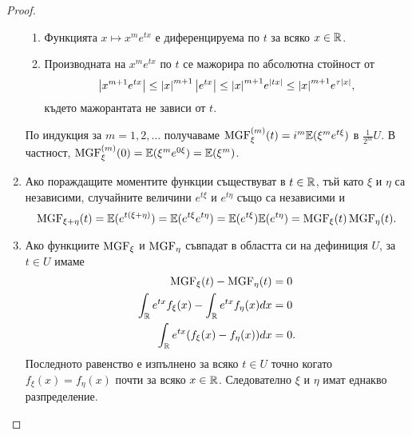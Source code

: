 \documentclass[numbers=endperiod, DIV=15, bibliography=totocnumbered]{scrartcl}
\begin{document}
\begin{proof}
\begin{enumerate}
\begin{enumerate}
      \item Функцията $x \mapsto x^m e^{t x}$ е диференцируема по $t$ за всяко $x \in \mathbb{R}$.
      \item Производната на $x^m e^{t x}$ по $t$ се мажорира по абсолютна стойност от
      \begin{displaymath}
        \left\vert x^{m+1} e^{t x} \right\vert
        \leq
        {\left\vert x \right\vert}^{m+1} \left\vert e^{t x} \right\vert
        \leq
        {\left\vert x \right\vert}^{m+1} e^{\left\vert t x \right\vert}
        \leq
        {\left\vert x \right\vert}^{m+1} e^{\tau \left\vert x \right\vert},
      \end{displaymath}
      където мажорантата не зависи от $t$.
    \end{enumerate}

    По индукция за $m = 1, 2, \ldots$ получаваме $\operatorname{MGF}^{(m)}_\xi(t) = i^m \mathbb{E}(\xi^m e^{t \xi})$ в $\frac 1 {2^m} U$. В частност, $\operatorname{MGF}^{(m)}_\xi(0) = \mathbb{E}(\xi^m e^{0 \xi}) = \mathbb{E}(\xi^m)$.

    \item Ако пораждащите моментите функции съществуват в $t \in \mathbb{R}$, тъй като $\xi$ и $\eta$ са независими, случайните величини $e^{t\xi}$ и $e^{t\eta}$ също са независими и
    \begin{displaymath}
      \operatorname{MGF}_{\xi + \eta}(t)
      =
      \mathbb{E}(e^{t(\xi + \eta)})
      =
      \mathbb{E}(e^{t\xi} e^{t\eta})
      =
      \mathbb{E}(e^{t\xi}) \mathbb{E}(e^{t\eta})
      =
      \operatorname{MGF}_\xi(t) \operatorname{MGF}_\eta(t).
    \end{displaymath}

    \item Ако функциите $\operatorname{MGF}_\xi$ и $\operatorname{MGF}_\eta$ съвпадат в областта си на дефиниция $U$, за $t \in U$ имаме
    \begin{align*}
      \operatorname{MGF}_\xi(t) - \operatorname{MGF}_\eta(t) &= 0
      \\
      \int_{\mathbb{R}} e^{tx} f_\xi(x) - \int_{\mathbb{R}} e^{tx} f_\eta(x) dx &= 0
      \\
      \int_{\mathbb{R}} e^{tx} (f_\xi(x) - f_\eta(x)) dx &= 0.
    \end{align*}
    Последното равенство е изпълнено за всяко $t \in U$ точно когато $f_\xi(x) = f_\eta(x)$ почти за всяко $x \in \mathbb{R}$. Следователно $\xi$ и $\eta$ имат еднакво разпределение.
  \end{enumerate}
\end{proof}
\end{document}
